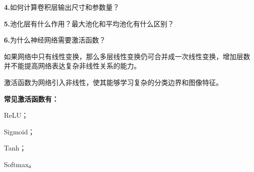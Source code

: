 \documentclass[UTF8,openany,oneside,zihao=-4,fontset=windows]{ctexbook}
\newif\ifshowsolutions
\newcommand{\Question}[2]{%
  \par\Needspace{4\baselineskip}\medskip
  \noindent\textbf{\color{MVBlue}#1}\quad #2\par
}
\newenvironment{AnswerBox}{\begin{tcolorbox}[breakable,colback=MVLight,colframe=MVBlue!45,title={参考答案},fonttitle=\bfseries,boxrule=0.55pt,arc=1.5mm,left=2mm,right=2mm,top=1.5mm,bottom=1.5mm]}{\end{tcolorbox}}
\newcommand{\PracticeSpace}[1]{\ifshowsolutions\else\par\vspace{#1}\par\fi}
\begin{document}
\else
\PracticeSpace{2.4cm}
\fi
\Question{4.}{如何计算卷积层输出尺寸和参数量？}
\ifshowsolutions
\begin{AnswerBox}
\par 输入特征图空间尺寸为 H
\begin{center}\small\ttfamily H\_in × W\_in\end{center}
\par\noindent\textbf{，卷积核大小为 K，填充为 P，步长为 S，则：}
\begin{center}\small\ttfamily H\_out = floor((H\_in + 2P - K)/S) + 1\end{center}
\par 宽度计算方法相同。
\par 如果输入通道数为 C
\par in
\par ，输出通道数为 C
\par out
\par\noindent\textbf{，包含偏置时参数量为：}
\begin{center}\small\ttfamily N = (K\_h K\_w C\_in + 1) C\_out\end{center}
\par\noindent\textbf{不包含偏置时为：}
\begin{center}\small\ttfamily N = K\_h K\_w C\_in C\_out\end{center}
\par 卷积层参数量与输入图像的高、宽无关。
\end{AnswerBox}
\else
\PracticeSpace{2.4cm}
\fi
\Question{5.}{池化层有什么作用？最大池化和平均池化有什么区别？}
\ifshowsolutions
\begin{AnswerBox}
\par\noindent\textbf{池化层主要作用是：}
\par\noindent\textbullet\quad 减小特征图空间尺寸；
\par\noindent\textbullet\quad 降低计算量和存储量；
\par\noindent\textbullet\quad 扩大后续神经元的有效感受野；
\par 提高对局部平移和形变的鲁棒性。
\par 最大池化取邻域最大值，更强调显著特征。
\par 平均池化取邻域平均值，更强调区域整体信息。
\par 普通池化层一般没有可学习参数，也通常不改变通道数。
\end{AnswerBox}
\else
\PracticeSpace{2.4cm}
\fi
\Question{6.}{为什么神经网络需要激活函数？}
\ifshowsolutions
\begin{AnswerBox}
\par 如果网络中只有线性变换，那么多层线性变换仍可合并成一次线性变换，增加层数并不能提高网络表达复杂非线性关系的能力。
\par 激活函数为网络引入非线性，使其能够学习复杂的分类边界和图像特征。
\par\noindent\textbf{常见激活函数有：}
\par\noindent\textbullet\quad ReLU；
\par\noindent\textbullet\quad Sigmoid；
\par\noindent\textbullet\quad Tanh；
\par Softmax。
\end{AnswerBox}
\end{document}
